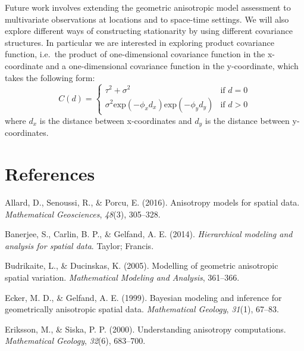 \documentclass[12pt,twoside]{dukestatscithesis}
\theoremstyle{definition}
\theoremstyle{definition}
\theoremstyle{definition}
\theoremstyle{remark}
\begin{document}
Future work involves extending the geometric anisotropic model
assessment to multivariate observations at locations and to space-time
settings. We will also explore different ways of constructing
stationarity by using different covariance structures. In particular we
are interested in exploring product covariance function, i.e.~the
product of one-dimensional covariance function in the x-coordinate and a
one-dimensional covariance function in the y-coordinate, which takes the
following form:
\begin{equation*}
C(d) = \begin{cases}
\tau^2 + \sigma^2 & \text{if $d=0$}\\
\sigma^2\text{exp}(-\phi_{x} d_{x})\text{exp}(-\phi_{y}d_{y}) & \text{if $d>0$}
\end{cases}
\end{equation*}
where \(d_{x}\) is the distance between x-coordinates and \(d_{y}\) is
the distance between y-coordinates.

\backmatter

\chapter*{References}\label{references}


\noindent

\setlength{\parindent}{-0.20in} \setlength{\leftskip}{0.20in}
\setlength{\parskip}{8pt}

\hypertarget{refs}{}
\hypertarget{ref-ASP2016}{}
Allard, D., Senoussi, R., \& Porcu, E. (2016). Anisotropy models for
spatial data. \emph{Mathematical Geosciences}, \emph{48}(3), 305--328.

\hypertarget{ref-BCG}{}
Banerjee, S., Carlin, B. P., \& Gelfand, A. E. (2014).
\emph{Hierarchical modeling and analysis for spatial data}. Taylor;
Francis.

\hypertarget{ref-BD2005}{}
Budrikaite, L., \& Ducinskas, K. (2005). Modelling of geometric
anisotropic spatial variation. \emph{Mathematical Modeling and
Analysis}, 361--366.

\hypertarget{ref-Gelfand1999}{}
Ecker, M. D., \& Gelfand, A. E. (1999). Bayesian modeling and inference
for geometrically anisotropic spatial data. \emph{Mathematical Geology},
\emph{31}(1), 67--83.

\hypertarget{ref-Eriksson2000}{}
Eriksson, M., \& Siska, P. P. (2000). Understanding anisotropy
computations. \emph{Mathematical Geology}, \emph{32}(6), 683--700.
\end{document}
